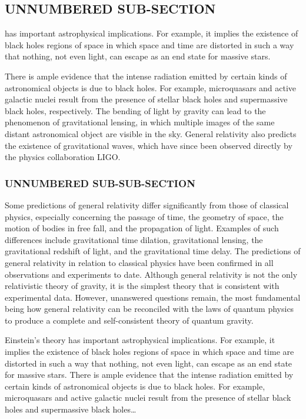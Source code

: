 \subsection*{UNNUMBERED SUB-SECTION}

\begin{warn}
has important astrophysical implications. For example, it
implies the existence of black holes regions of space in which space and time
are distorted in such a way that nothing, not even light, can escape as an
end state for massive stars.
\end{warn}

There is ample evidence that the intense radiation
emitted by certain kinds of astronomical objects is due to black holes. For
example, microquasars and active galactic nuclei result from the presence of
stellar black holes and supermassive black holes, respectively. The bending of
light by gravity can lead to the phenomenon of gravitational lensing, in which
multiple images of the same distant astronomical object are visible in the sky.
General relativity also predicts the existence of gravitational waves, which
have since been observed directly by the physics collaboration LIGO.
\subsubsection*{UNNUMBERED SUB-SUB-SECTION}
Some predictions of general relativity differ significantly from those of
classical physics, especially concerning the passage of time, the geometry of
space, the motion of bodies in free fall, and the propagation of light. Examples
of such differences include gravitational time dilation, gravitational lensing,
the gravitational redshift of light, and the gravitational time delay. The
predictions of general relativity in relation to classical physics have been
confirmed in all observations and experiments to date. Although general
relativity is not the only relativistic theory of gravity, it is the simplest
theory that is consistent with experimental data. However, unanswered questions
remain, the most fundamental being how general relativity can be reconciled with
the laws of quantum physics to produce a complete and self-consistent theory of
quantum gravity.

Einstein's theory has important astrophysical implications. For example, it
implies the existence of black holes regions of space in which space and time
are distorted in such a way that nothing, not even light, can escape as an
end state for massive stars. There is ample evidence that the intense radiation
emitted by certain kinds of astronomical objects is due to black holes. For
example, microquasars and active galactic nuclei result from the presence of
stellar black holes and supermassive black holes\ldots


